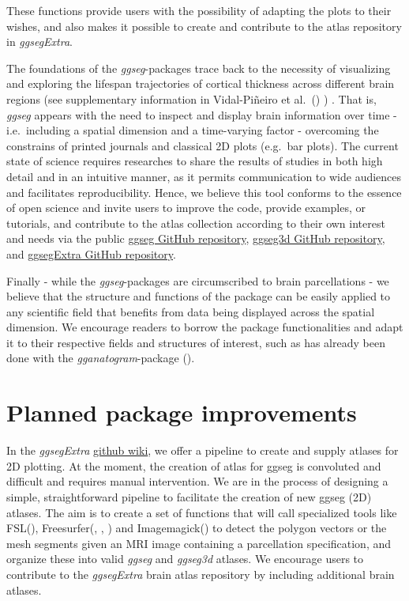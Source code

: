 \documentclass[fleqn,10pt]{wlpeerj} %
\begin{document}
These functions provide users with the possibility of adapting the plots to their wishes, and also makes it possible to create and contribute to the atlas repository in \emph{ggsegExtra}.

The foundations of the \emph{ggseg}-packages trace back to the necessity of visualizing and exploring the lifespan trajectories of cortical thickness across different brain regions (see supplementary information in Vidal-Piñeiro et al.~(\citeyearpar{vidal_2019}) ) .
That is, \emph{ggseg} appears with the need to inspect and display brain information over time - i.e.~including a spatial dimension and a time-varying factor - overcoming the constrains of printed journals and classical 2D plots (e.g.~bar plots).
The current state of science requires researches to share the results of studies in both high detail and in an intuitive manner, as it permits communication to wide audiences and facilitates reproducibility.
Hence, we believe this tool conforms to the essence of open science and invite users to improve the code, provide examples, or tutorials, and contribute to the atlas collection according to their own interest and needs via the public \href{https://github.com/LCBC-UiO/ggseg}{ggseg GitHub repository}, \href{https://github.com/LCBC-UiO/ggseg3d}{ggseg3d GitHub repository}, and \href{https://github.com/LCBC-UiO/ggsegExtra}{ggsegExtra GitHub repository}.

Finally - while the \emph{ggseg}-packages are circumscribed to brain parcellations - we believe that the structure and functions of the package can be easily applied to any scientific field that benefits from data being displayed across the spatial dimension.
We encourage readers to borrow the package functionalities and adapt it to their respective fields and structures of interest, such as has already been done with the \emph{gganatogram}-package (\citet{gganatogram}).

\hypertarget{planned-package-improvements}{%
\section{Planned package improvements}\label{planned-package-improvements}}

In the \emph{ggsegExtra} \href{https://github.com/LCBC-UiO/ggsegExtra/wiki/Contributing\%3A-polygon-atlases-new}{github wiki}, we offer a pipeline to create and supply atlases for 2D plotting.
At the moment, the creation of atlas for ggseg is convoluted and difficult and requires manual intervention.
We are in the process of designing a simple, straightforward pipeline to facilitate the creation of new ggseg (2D) atlases.
The aim is to create a set of functions that will call specialized tools like FSL(\citet{fsl}), Freesurfer(\citet{fischl_99}, \citet{dale_99}, \citet{Fischl2000}) and Imagemagick(\citet{magick}) to detect the polygon vectors or the mesh segments given an MRI image containing a parcellation specification, and organize these into valid \emph{ggseg} and \emph{ggseg3d} atlases.
We encourage users to contribute to the \emph{ggsegExtra} brain atlas repository by including additional brain atlases.
\end{document}

